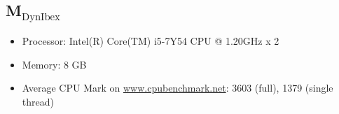 \documentclass[EPiC]{easychair}
\begin{document}

\subsection{\texorpdfstring{M$_{\text{DynIbex}}$}{M-DynIbex}} \label{sec:machine:DynIbex}
\begin{itemize}
 \item Processor: Intel(R) Core(TM) i5-7Y54 CPU @ 1.20GHz x 2
 \item Memory: 8 GB
 \item Average CPU Mark on \url{www.cpubenchmark.net}: 3603 (full), 1379 (single thread)
\end{itemize}



%
%
%

\end{document}
